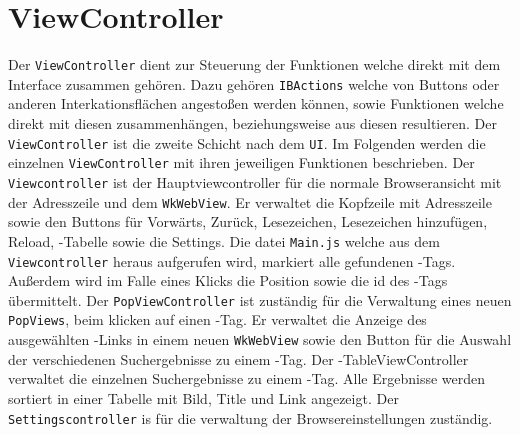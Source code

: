 
\section{ViewController}
Der \lstinline|ViewController| dient zur Steuerung der Funktionen welche direkt mit dem Interface zusammen gehören. Dazu gehören
\lstinline|IBActions| welche von Buttons oder anderen Interkationsflächen angestoßen werden können, sowie Funktionen welche direkt mit diesen zusammenhängen, beziehungsweise aus diesen resultieren. Der \lstinline|ViewController| ist die zweite Schicht nach dem \lstinline|UI|. Im
Folgenden werden die einzelnen \lstinline|ViewController| mit ihren jeweiligen Funktionen beschrieben.
Der \lstinline|Viewcontroller| ist der Hauptviewcontroller für die normale Browseransicht mit der Adresszeile und dem \lstinline|WkWebView|. Er verwaltet die Kopfzeile mit Adresszeile sowie den Buttons für Vorwärts, Zurück, Lesezeichen, Lesezeichen hinzufügen, Reload, \SECH-Tabelle sowie die Settings. Die datei \lstinline|Main.js| welche aus dem \lstinline|Viewcontroller| heraus aufgerufen wird, markiert alle gefundenen \SEARCH-Tags. Außerdem wird im Falle eines Klicks die Position sowie die id des \SEARCH-Tags übermittelt.
Der \lstinline|PopViewController| ist zuständig für die Verwaltung eines neuen \lstinline|PopViews|, beim klicken auf einen \SEARCH-Tag. Er verwaltet die Anzeige des ausgewählten \SEARCH-Links in einem neuen \lstinline|WkWebView| sowie den Button für die Auswahl der verschiedenen Suchergebnisse zu einem \SEARCH-Tag.
Der \SEARCH-TableViewController verwaltet die einzelnen Suchergebnisse zu einem \SEARCH-Tag. Alle Ergebnisse werden sortiert in einer Tabelle mit Bild, Title und Link angezeigt.
Der \lstinline|Settingscontroller| is für die verwaltung der Browsereinstellungen zuständig.


